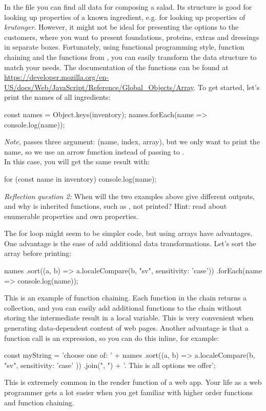 \documentclass[fleqn, article, a4paper]{memoir}
\begin{document}
\begin{Assignments}
\item In the  file you can find all data for composing a salad. Its structure is good for looking up properties of a known ingredient, e.g.  for looking up properties of \emph{krutonger}. However, it might not be ideal for presenting the options to the customers, where you want to present foundations, proteins, extras and dressings in separate boxes. Fortunately, using functional programming style, function chaining and the functions from , you can easily transform the data structure to match your needs. The documentation of the functions can be found at \url{https://developer.mozilla.org/en-US/docs/Web/JavaScript/Reference/Global_Objects/Array}. To get started, let's print the names of all ingredients:
\begin{Code}
const names = Object.keys(inventory);
names.forEach(name => console.log(name));
\end{Code}
\emph{Note,}  passes three argument: (name, index, array), but we only want to print the name, so we use an arrow function instead of passing  to .
\\In this case, you will get the same result with:
\begin{Code}
for (const name in inventory) {
  console.log(name);
}
\end{Code}
\emph{Reflection question 2:} When will the two examples above give different outputs, and why is inherited functions, such as , not printed? Hint: read about enumerable properties and own properties.

The for loop might seem to be simpler code, but using arrays have advantages. One advantage is the ease of add additional data transformations. Let's sort the array before printing:
\begin{Code}
names
.sort((a, b) => a.localeCompare(b, "sv", {sensitivity: 'case'}))
.forEach(name => console.log(name));
\end{Code}
This is an example of function chaining. Each function in the chain returns a collection, and you can easily add additional functions to the chain without storing the intermediate result in a local variable. This is very convenient when generating data-dependent content of web pages. Another advantage is that a function call is an expression, so you can do this inline, for example:
\begin{Code}
const myString = 'choose one of: ' +
  names
    .sort((a, b) => a.localeCompare(b, "sv", { sensitivity: 'case' }))
    .join(", ")
  + '. This is all options we offer';
\end{Code}
\noindent This is extremely common in the render function of a web app. Your life as a web programmer gets a lot easier when you get familiar with higher order functions and function chaining.


\end{Assignments}
\end{document}
